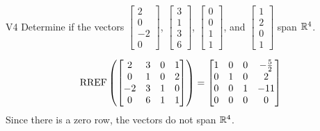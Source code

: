 \begin{problem}{V4}
Determine if the vectors \(\begin{bmatrix} 2 \\ 0 \\ -2 \\ 0 \end{bmatrix}\), \(\begin{bmatrix} 3 \\ 1 \\ 3 \\ 6 \end{bmatrix}\), \(\begin{bmatrix} 0 \\ 0 \\ 1 \\ 1 \end{bmatrix}\), and \(\begin{bmatrix}1 \\ 2 \\ 0 \\ 1 \end{bmatrix}\) span \(\mathbb{R}^4\).
\end{problem}
\begin{solution}
\[\operatorname{RREF}\left( \begin{bmatrix} 2 & 3 & 0 & 1 \\ 0 & 1 & 0 & 2 \\ -2 & 3 & 1 & 0 \\ 0 & 6 & 1 & 1\end{bmatrix} \right) = \begin{bmatrix}1 & 0 & 0 & -\frac{5}{2} \\ 0 & 1 & 0 & 2 \\ 0 & 0 & 1 & -11\\ 0 & 0 & 0 & 0  \end{bmatrix}\]
Since there is a zero row, the vectors do not span \(\mathbb{R}^4\).
\end{solution}

